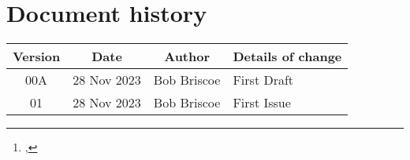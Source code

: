 \documentclass[a4paper,twoside,twocolumn]{article}
\title{\metatitle}%
\author{\metaauthori%
\thanks{\metamaili, %
\metaaddress}%
\ %
}
\date{\metadate}%
\newcommand{\bob}[1]{\todo[color=olive!40,inline]{Bob: #1}}
\newcommand*{\metaversion}{01}
\newcommand*{\metadate}{28 Nov 2023}
\begin{document}
%


\maketitle%
\thispagestyle{first}

\begin{abstract}
{\small\noindent%
}      %
\end{abstract}

\newpage
{}

{%
\scriptsize%
}

\clearpage
\appendix
\onecolumn%

\onecolumn%
\section*{Document history}

\begin{tabular}{|c|c|c|p{3.5in}|}
 \hline
Version &Date &Author &Details of change \\
 \hline\hline
00A          &28 Nov 2023&Bob Briscoe &First Draft\\\hline%
\metaversion &\metadate  &Bob Briscoe &First Issue\\\hline%
\hline%
\end{tabular}
\end{document}
